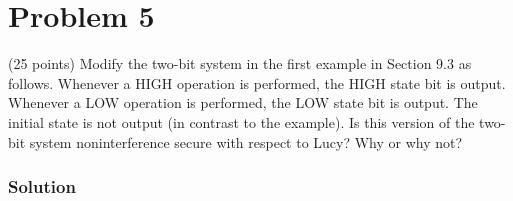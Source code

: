 \section*{Problem 5}
(25 points) Modify the two-bit system in the first example in Section 9.3 as follows. 
Whenever a HIGH operation is performed, the HIGH state bit is output. 
Whenever a LOW operation is performed, the LOW state bit is output. The initial state is not output (in contrast to the example). 
Is this version of the two-bit system noninterference secure with respect to Lucy? Why or why not?

\subsubsection*{Solution}
